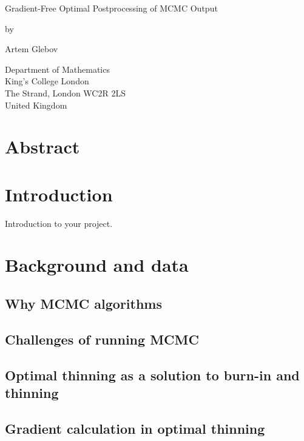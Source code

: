 \documentclass[12pt,a4paper]{report}
\date{}
\begin{document}
\thispagestyle{empty}
\begin{center}
{\huge
Gradient-Free Optimal Postprocessing of MCMC Output

\bigskip
\bigskip

by
\bigskip
\bigskip

Artem Glebov
}
\end{center}
\vfill

\begin{center}
{\large
Department of Mathematics\\
King's College London\\
The Strand, London WC2R 2LS\\
United Kingdom\\
\medskip

}
\end{center}
\bigskip


\newpage
\setcounter{page}{1}

\chapter*{Abstract}


\tableofcontents


\chapter*{Introduction}
Introduction to your project.

\chapter{Background and data}

\section{Why MCMC algorithms}

\section{Challenges of running MCMC}

\section{Optimal thinning as a solution to burn-in and thinning}

\section{Gradient calculation in optimal thinning}
\end{document}
